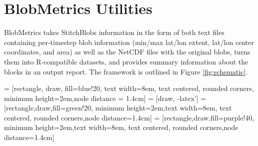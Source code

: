 \documentclass{article}
\begin{document}
\section{BlobMetrics Utilities}

BlobMetrics takes StitchBlobs information in the form of both text files containing per-timestep blob information (min/max lat/lon extent, lat/lon center coordinates, and area) as well as the NetCDF files with the original blobs, turns them into R-compatible datasets, and provides summary information about the blocks in an output report. The framework is outlined in Figure \ref{fig:schematic}.

 = [rectangle, draw, fill=blue!20, 
    text width=8em, text centered, rounded corners, minimum height=2em,node distance = 1.4cm]
 = [draw, -latex']
 = [rectangle,draw,fill=green!20,
    minimum height=2em,text width=8em, text centered, rounded corners,node distance=1.4cm]
 = [rectangle,draw,fill=purple!40,
    minimum height=2em,text width=8em, text centered, rounded corners,node distance=1.4cm]
\end{document}

